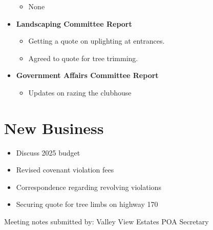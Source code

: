 \documentclass[10pt,a4paper]{article}
\begin{document}
\begin{itemize}
\begin{itemize}
    \item None
  \end{itemize}
  \item \textbf{Landscaping Committee Report}
  \begin{itemize}
    \item Getting a quote on uplighting at entrances.
    \item Agreed to quote for tree trimming.
  \end{itemize}
  \item \textbf{Government Affairs Committee Report}
  \begin{itemize}
    \item Updates on razing the clubhouse
  \end{itemize}
\end{itemize}

\section*{New Business}
\begin{itemize}
  \item Discuss 2025 budget
  \item Revised covenant violation fees
  \item Correspondence regarding revolving violations
  \item Securing quote for tree limbs on highway 170
\end{itemize}

\begin{flushleft}
Meeting notes submitted by:\break{}
\@author\break{}
Valley View Estates POA Secretary
\end{flushleft}
\end{document}
